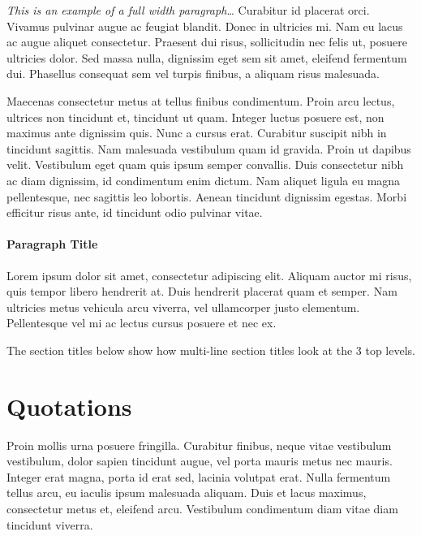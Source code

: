 \documentclass[
	a4paper, %
	12pt, %
]{include/CSSullivanBusinessReport}
\begin{document}
\begin{fullwidth} %
	\textit{This is an example of a full width paragraph\ldots} Curabitur id placerat orci. Vivamus pulvinar augue ac feugiat blandit. Donec in ultricies mi. Nam eu lacus ac augue aliquet consectetur. Praesent dui risus, sollicitudin nec felis ut, posuere ultricies dolor. Sed massa nulla, dignissim eget sem sit amet, eleifend fermentum dui. Phasellus consequat sem vel turpis finibus, a aliquam risus malesuada.
\end{fullwidth}

Maecenas consectetur metus at tellus finibus condimentum. Proin arcu lectus, ultrices non tincidunt et, tincidunt ut quam. Integer luctus posuere est, non maximus ante dignissim quis. Nunc a cursus erat. Curabitur suscipit nibh in tincidunt sagittis. Nam malesuada vestibulum quam id gravida. Proin ut dapibus velit. Vestibulum eget quam quis ipsum semper convallis. Duis consectetur nibh ac diam dignissim, id condimentum enim dictum. Nam aliquet ligula eu magna pellentesque, nec sagittis leo lobortis. Aenean tincidunt dignissim egestas. Morbi efficitur risus ante, id tincidunt odio pulvinar vitae.

\paragraph{Paragraph Title} %

Lorem ipsum dolor sit amet, consectetur adipiscing elit. Aliquam auctor mi risus, quis tempor libero hendrerit at. Duis hendrerit placerat quam et semper. Nam ultricies metus vehicula arcu viverra, vel ullamcorper justo elementum. Pellentesque vel mi ac lectus cursus posuere et nec ex.

The section titles below show how multi-line section titles look at the 3 top levels.



\section{Quotations}

Proin mollis urna posuere fringilla. Curabitur finibus, neque vitae vestibulum vestibulum, dolor sapien tincidunt augue, vel porta mauris metus nec mauris. Integer erat magna, porta id erat sed, lacinia volutpat erat. Nulla fermentum tellus arcu, eu iaculis ipsum malesuada aliquam. Duis et lacus maximus, consectetur metus et, eleifend arcu. Vestibulum condimentum diam vitae diam tincidunt viverra. %
\end{document}
